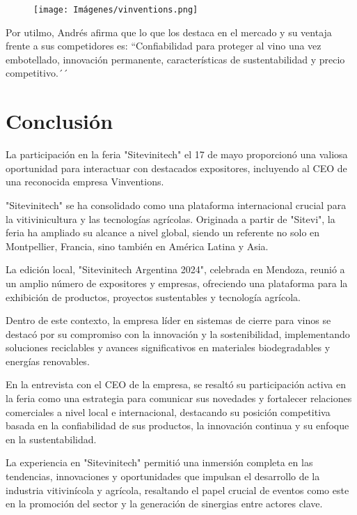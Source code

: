 \begin{figure}[h]
    \centering
    \texttt{[image: Imágenes/vinventions.png]}
\end{figure}

Por utilmo, Andrés afirma que lo que los destaca en el mercado y su ventaja frente a sus competidores es: ``Confiabilidad para proteger al vino una vez embotellado, innovación permanente, características de sustentabilidad y precio competitivo.´´

 \section{Conclusión}
 
 La participación en la feria "Sitevinitech" el 17 de mayo proporcionó una valiosa oportunidad para interactuar con destacados expositores, incluyendo al CEO de una reconocida empresa Vinventions.

"Sitevinitech" se ha consolidado como una plataforma internacional crucial para la vitivinicultura y las tecnologías agrícolas. Originada a partir de "Sitevi", la feria ha ampliado su alcance a nivel global, siendo un referente no solo en Montpellier, Francia, sino también en América Latina y Asia.

La edición local, "Sitevinitech Argentina 2024", celebrada en Mendoza, reunió a un amplio número de expositores y empresas, ofreciendo una plataforma para la exhibición de productos, proyectos sustentables y tecnología agrícola.

Dentro de este contexto, la empresa líder en sistemas de cierre para vinos se destacó por su compromiso con la innovación y la sostenibilidad, implementando soluciones reciclables y avances significativos en materiales biodegradables y energías renovables.

En la entrevista con el CEO de la empresa, se resaltó su participación activa en la feria como una estrategia para comunicar sus novedades y fortalecer relaciones comerciales a nivel local e internacional, destacando su posición competitiva basada en la confiabilidad de sus productos, la innovación continua y su enfoque en la sustentabilidad.

 La experiencia en "Sitevinitech" permitió una inmersión completa en las tendencias, innovaciones y oportunidades que impulsan el desarrollo de la industria vitivinícola y agrícola, resaltando el papel crucial de eventos como este en la promoción del sector y la generación de sinergias entre actores clave.